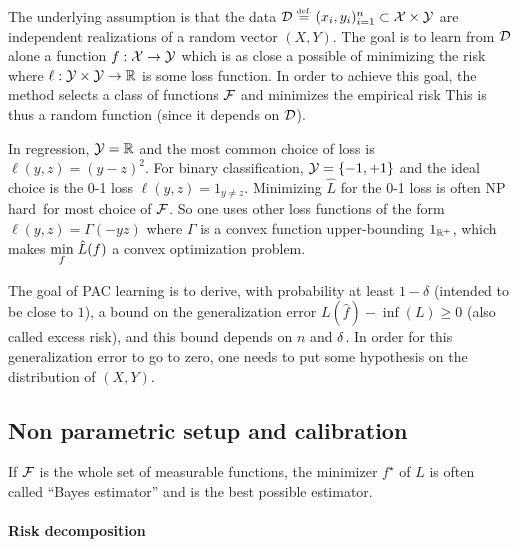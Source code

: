 


The underlying assumption is that the data $\mathcal{D} \stackrel{\mbox{\upshape\tiny def.}}{=} (x_i,y_i)_{i=1}^n \subset \mathcal{X} \times \mathcal{Y}$ are independent realizations of a random vector $(X,Y)$. The goal is to learn from $\mathcal{D}$ alone a function $f : \mathcal{X} \rightarrow \mathcal{Y}$ which is as close a possible of minimizing the risk 
where $\ell : \mathcal{Y} \times \mathcal{Y} \rightarrow \mathbb{R}$ is some loss function. 
%
In order to achieve this goal, the method selects a class of functions $\mathcal{F}$ and minimizes the empirical risk 
This is thus a random function (since it depends on $\mathcal{D}$).  

\begin{exmp}
	In regression, $\mathcal{Y}=\mathbb{R}$ and the most common choice of loss is $\ell(y,z) = (y-z)^2$.
	For binary classification, $\mathcal{Y}=\{-1,+1\}$ and the ideal choice is the 0-1 loss $\ell(y,z)=1_{y \neq z}$.
	Minimizing $\hat L$ for the 0-1 loss is often NP hard for most choice of $\mathcal{F}$.  So one uses other loss functions of the form $\ell(y,z) = \Gamma(-yz)$ where $\Gamma$ is a convex function upper-bounding $1_{\mathbb{R}^+}$, which makes $\underset{f}{\min}\; \hat L(f)$ a convex optimization problem. 
	\end{exmp}
	
The goal of PAC learning is to derive, with probability at least $1-\delta$ (intended to be close to $1$), a bound on the generalization error $L(\hat f) - \inf(L) \geq 0$ (also called excess risk), and this bound  depends on $n$ and $\delta$. In order for this generalization error to go to zero, one needs to put some hypothesis on the distribution of $(X,Y)$. 


\subsection{Non parametric setup and calibration}

If $\mathcal{F}$ is the whole set of measurable functions, the minimizer $f^\star$ of $L$ is often called ``Bayes estimator'' and is the best possible estimator. 


\paragraph{Risk decomposition}

